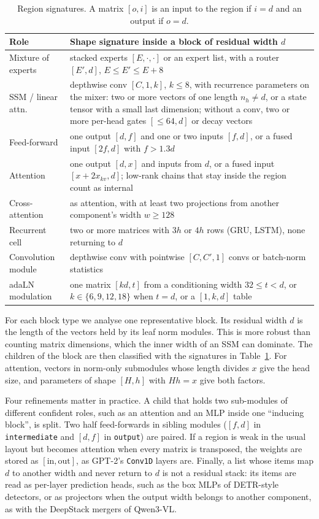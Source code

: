 \documentclass[11pt]{article}
\newcommand{\tn}[1]{\texttt{#1}}
\begin{document}
\begin{table}[t]
\centering
\small
\begin{tabular}{@{}lp{11.2cm}@{}}
\toprule
Role & Shape signature inside a block of residual width $d$ \\
\midrule
Mixture of experts & stacked experts $[E,\cdot,\cdot]$ or an expert list, with a router $[E',d]$, $E\le E'\le E+8$ \\
SSM / linear attn. & depthwise conv $[C,1,k]$, $k\le 8$, with recurrence parameters on the mixer: two or more vectors of one length $n_h\ne d$, or a state tensor with a small last dimension; without a conv, two or more per-head gates $[\le 64, d]$ or decay vectors \\
Feed-forward & one output $[d,f]$ and one or two inputs $[f,d]$, or a fused input $[2f,d]$ with $f>1.3d$ \\
Attention & one output $[d,x]$ and inputs from $d$, or a fused input $[x+2x_{kv},d]$; low-rank chains that stay inside the region count as internal \\
Cross-attention & as attention, with at least two projections from another component's width $w\ge 128$ \\
Recurrent cell & two or more matrices with $3h$ or $4h$ rows (GRU, LSTM), none returning to $d$ \\
Convolution module & depthwise conv with pointwise $[C,C',1]$ convs or batch-norm statistics \\
adaLN modulation & one matrix $[kd,t]$ from a conditioning width $32\le t<d$, or $k\in\{6,9,12,18\}$ when $t=d$, or a $[1,k,d]$ table \\
\bottomrule
\end{tabular}
\caption{Region signatures. A matrix $[o,i]$ is an input to the region if $i=d$ and an output if $o=d$.}
\label{tab:rules}
\end{table}

For each block type we analyse one representative block. Its residual width $d$ is the length of the vectors held by its leaf norm modules. This is more robust than counting matrix dimensions, which the inner width of an SSM can dominate. The children of the block are then classified with the signatures in Table~\ref{tab:rules}. For attention, vectors in norm-only submodules whose length divides $x$ give the head size, and parameters of shape $[H,h]$ with $Hh=x$ give both factors.

Four refinements matter in practice. A child that holds two sub-modules of different confident roles, such as an attention and an MLP inside one ``inducing block'', is split. Two half feed-forwards in sibling modules ($[f,d]$ in \tn{intermediate} and $[d,f]$ in \tn{output}) are paired. If a region is weak in the usual layout but becomes attention when every matrix is transposed, the weights are stored as $[\text{in},\text{out}]$, as GPT-2's \tn{Conv1D} layers are. Finally, a list whose items map $d$ to another width and never return to $d$ is not a residual stack: its items are read as per-layer prediction heads, such as the box MLPs of DETR-style detectors, or as projectors when the output width belongs to another component, as with the DeepStack mergers of Qwen3-VL.
\end{document}
